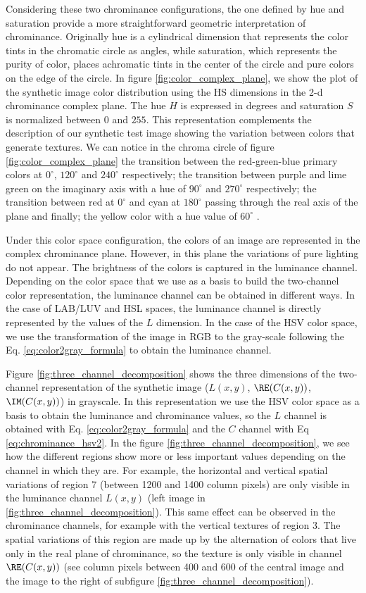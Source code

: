 Considering these two chrominance configurations, the one defined by hue and saturation provide a more straightforward geometric interpretation of chrominance. Originally hue is a cylindrical dimension that represents the color tints in the chromatic circle as angles, while saturation, which represents the purity of color, places achromatic tints in the center of the circle and pure colors on the edge of the circle. In figure \ref{fig:color_complex_plane}, we show the plot of the synthetic image color distribution using the HS dimensions in the 2-d chrominance complex plane. The hue $H$ is expressed in degrees and saturation $S$ is normalized between $0$ and $255$. This representation complements the description of our synthetic test image showing the variation between colors that generate textures. We can notice in the chroma circle of figure \ref{fig:color_complex_plane} the transition between the red-green-blue primary colors at $0^\circ$, $120^\circ$ and $240^\circ$ respectively; the transition between purple and lime green on the imaginary axis with a hue of $90^\circ$ and $270^\circ$ respectively; the transition between red at $0^\circ$ and cyan at $180^\circ$ passing through the real axis of the plane and finally; the yellow color with a hue value of $60^\circ$ .

Under this color space configuration, the colors of an image are represented in the complex chrominance plane. However, in this plane the variations of pure lighting do not appear. The brightness of the colors is captured in the luminance channel. Depending on the color space that we use as a basis to build the two-channel color representation, the luminance channel can be obtained in different ways. In the case of LAB/LUV and HSL spaces, the luminance channel is directly represented by the values of the $L$ dimension. In the case of the HSV color space, we use the transformation of the image in RGB to the gray-scale following the Eq. \eqref{eq:color2gray_formula} to obtain the luminance channel.

Figure \ref{fig:three_channel_decomposition} shows the three dimensions of the two-channel representation of the synthetic image ($L(x,y)$, $\RE(C(x,y))$, $\IM(C(x,y))$) in grayscale. In this representation we use the HSV color space as a basis to obtain the luminance and chrominance values, so the $L$ channel is obtained with Eq. \eqref{eq:color2gray_formula} and the $C$ channel with Eq \eqref{eq:chrominance_hsv2}. In the figure \ref{fig:three_channel_decomposition}, we see how the different regions show more or less important values depending on the channel in which they are. For example, the horizontal and vertical spatial variations of region 7 (between 1200 and 1400 column pixels) are only visible in the luminance channel $L(x,y)$ (left image in \ref{fig:three_channel_decomposition}). This same effect can be observed in the chrominance channels, for example with the vertical textures of region 3. The spatial variations of this region are made up by the alternation of colors that live only in the real plane of chrominance, so the texture is only visible in channel $\RE(C(x,y))$ (see column pixels between 400 and 600 of the central image and the image to the right of subfigure \ref{fig:three_channel_decomposition}). 

